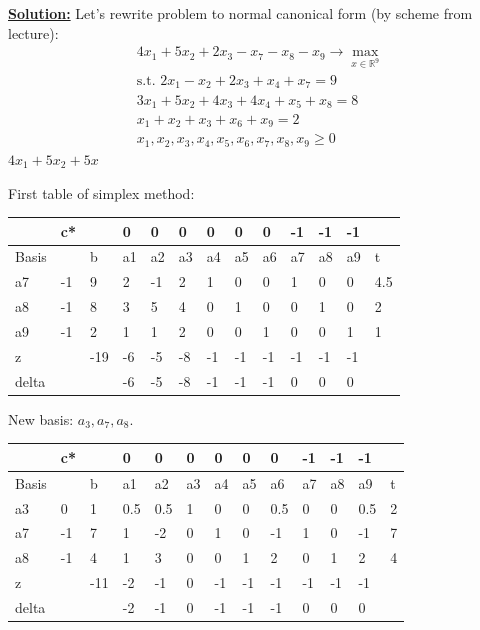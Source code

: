 \underline{\textbf{Solution:}}
Let's rewrite problem to normal canonical form (by scheme from lecture): 
\begin{equation*}
    \begin{gathered}
        4x_1 + 5x_2 + 2x_3 - x_7 - x_8 - x_9  \rightarrow \max_{x \in \mathds{R}^9}\\
        \text{s.t.  } 2x_1 - x_2 + 2x_3 + x_4 + x_7 = 9\\
                     3x_1 + 5x_2 + 4x_3 + 4x_4 + x_5 + x_8 = 8 \\
                     x_1 + x_2 + x_3 + x_6 + x_9 = 2 \\
                     x_1, x_2, x_3, x_4, x_5, x_6, x_7, x_8, x_9 \geq 0 
    \end{gathered}
\end{equation*}
$4x_1 + 5x_2 + 5x$

First table of simplex method:
\begin{table}[H]
\begin{tabular}{|l|l|l|l|l|l|l|l|l|l|l|l|l|}
\hline
      & c* &    & 0  & 0  & 0  & 0  & 0  & 0  & -1 & -1 & -1 &     \\ \hline
Basis &    & b   & a1 & a2 & a3 & a4 & a5 & a6 & a7 & a8 & a9 & t   \\ \hline
a7    & -1 & 9   & 2  & -1 & 2  & 1  & 0  & 0  & 1  & 0  & 0  & 4.5 \\ \hline
a8    & -1 & 8   & 3  & 5  & 4  & 0  & 1  & 0  & 0  & 1  & 0  & 2   \\ \hline
a9    & -1 & 2   & 1  & 1  & 2  & 0  & 0  & 1  & 0  & 0  & 1  & 1   \\ \hline
z     &    & -19 & -6 & -5 & -8 & -1 & -1 & -1 & -1 & -1 & -1 &     \\ \hline
delta &    &     & -6 & -5 & -8 & -1 & -1 & -1 & 0  & 0  & 0  &     \\ \hline
\end{tabular}
\end{table}

New basis: $a_3, a_7, a_8$.

\begin{table}[H]
\begin{tabular}{|l|l|l|l|l|l|l|l|l|l|l|l|l|}
\hline
      & c* &     & 0   & 0   & 0  & 0  & 0  & 0   & -1 & -1 & -1  &   \\ \hline
Basis &    & b   & a1  & a2  & a3 & a4 & a5 & a6  & a7 & a8 & a9  & t \\ \hline
a3    & 0  & 1   & 0.5 & 0.5 & 1  & 0  & 0  & 0.5 & 0  & 0  & 0.5 & 2 \\ \hline
a7    & -1 & 7   & 1   & -2  & 0  & 1  & 0  & -1  & 1  & 0  & -1  & 7 \\ \hline
a8    & -1 & 4   & 1   & 3   & 0  & 0  & 1  & 2   & 0  & 1  & 2   & 4 \\ \hline
z     &    & -11 & -2  & -1  & 0  & -1 & -1 & -1  & -1 & -1 & -1  &   \\ \hline
delta &    &     & -2  & -1  & 0  & -1 & -1 & -1  & 0  & 0  & 0   &   \\ \hline
\end{tabular}
\end{table}

